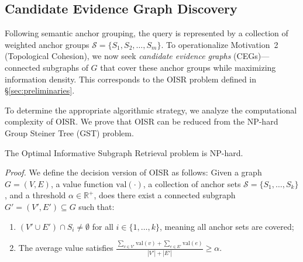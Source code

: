 \subsection{Candidate Evidence Graph Discovery}\label{sec:ceg-discovery}


Following semantic anchor grouping, the query is represented by a collection of weighted anchor groups $\mathcal{S}=\{S_1,S_2,\dots,S_m\}$. To operationalize Motivation~2 (Topological Cohesion), we now seek \emph{candidate evidence graphs} (CEGs)---connected subgraphs of $G$ that cover these anchor groups while maximizing information density. This corresponds to the OISR problem defined in \S\ref{sec:preliminaries}.



To determine the appropriate algorithmic strategy, we analyze the computational complexity of OISR. We prove that OISR can be reduced from the NP-hard Group Steiner Tree (GST) problem\cite{2003-plylog,2009-Karp-NP-NPC-NP-Reduce}.

\begin{thm}\label{thm:nphard}
The Optimal Informative Subgraph Retrieval problem is NP-hard.
\end{thm}

\textit{Proof.} We define the decision version of OISR as follows: Given a graph $G=(V,E)$, a value function $\mathrm{val}(\cdot)$, a collection of anchor sets $\mathcal{S} = \{S_1, \dots, S_k\}$, and a threshold $\alpha \in \mathbb{R}^+$, does there exist a connected subgraph $G'=(V',E') \subseteq G$ such that:
\begin{enumerate}[label=(\roman*)]
    \item $(V' \cup E') \cap S_i \neq \emptyset$ for all $i \in \{1, \dots, k\}$, meaning all anchor sets are covered;
    \item The average value satisfies $\frac{\sum_{v \in V'} \mathrm{val}(v) + \sum_{e \in E'} \mathrm{val}(e)}{|V'| + |E'|} \ge \alpha$.
\end{enumerate}

